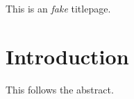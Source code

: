 \documentclass{report}
\begin{document}
\begin{titlepage}
\huge
This is an \emph{fake} titlepage.
\end{titlepage}

\begin{abstract}
Orphan abstract should follow even a fake titlepage.
\end{abstract}

\section{Introduction}
This follows the abstract.
\end{document}
